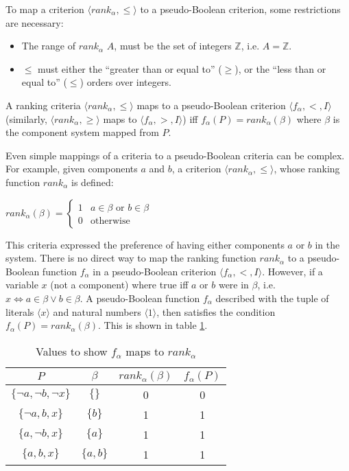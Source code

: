 To map a criterion $\langle rank_{\alpha},\leq \rangle$ to a pseudo-Boolean criterion,
some restrictions are necessary:
\begin{itemize}
  \item The range of $rank_{\alpha}$ $A$, must be the set of integers $\mathbb{Z}$, i.e. $A = \mathbb{Z}$.
  \item $\leq$ must either the ``greater than or equal to'' ($\geq$), or the ``less than or equal to'' ($\leq$) orders over integers.
\end{itemize} 

\begin{defs}
A ranking criteria $\langle rank_{\alpha},\leq \rangle$ maps to a pseudo-Boolean criterion  $\langle f_{\alpha}, < , I \rangle$ 
(similarly, $\langle rank_{\alpha},\geq \rangle $ maps to $ \langle f_{\alpha}, > , I \rangle$) iff
$f_{\alpha}(P) = rank_{\alpha}(\beta)$ where $\beta$ is the component system mapped from $P$. 
\end{defs}

Even simple mappings of a criteria to a pseudo-Boolean criteria can be complex.
For example, given components $a$ and $b$, a criterion $\langle rank_{\alpha},\leq \rangle$, whose ranking function $rank_{\alpha}$ is defined:

$rank_{\alpha}(\beta) = \begin{cases} 1 & a \in \beta \text{ or } b \in \beta\\ 0 & \text{otherwise} \end{cases}$

This criteria expressed the preference of having either components $a$ or $b$ in the system.
There is no direct way to map the ranking function $rank_{\alpha}$ to a pseudo-Boolean function $f_{\alpha}$ in a pseudo-Boolean criterion $\langle f_{\alpha}, < , I \rangle$.
However, if a variable $x$ (not a component) where true iff $a$ or $b$ were in $\beta$, i.e. $x \Leftrightarrow a \in \beta \vee b \in \beta$.
A pseudo-Boolean function $f_{\alpha}$ described with the tuple of literals $\langle x \rangle$ and natural numbers $\langle 1 \rangle$,
then satisfies the condition $f_{\alpha}(P) = rank_{\alpha}(\beta)$.
This is shown in table \ref{impl.critmapexmp}.
\begin{table}[h!]
\centering
\begin{tabular}{| c | c | c | c |}
\hline
$P$                                &    $\beta$            & $rank_{\alpha}(\beta)$     & $f_{\alpha}(P)$\\ \hline    
$\{\neg a, \neg b, \neg x\}$     & $\{\}$                & 0                        & 0 \\
$\{\neg a,  b, x\}$             & $\{b\}$                & 1                        & 1 \\
$\{ a,  \neg b, x\}$             & $\{a\}$                & 1                        & 1 \\
$\{ a,  b, x\}$                 & $\{a,b\}$                & 1                        & 1 \\ \hline
\end{tabular}
\caption{Values to show $f_{\alpha}$  maps to $rank_{\alpha}$}
\label{impl.critmapexmp}
\end{table}

